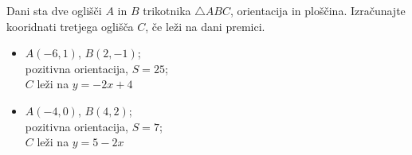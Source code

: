             \begin{naloga}
                Dani sta dve oglišči $A$ in $B$ trikotnika $\triangle ABC$, orientacija in ploščina. Izračunajte kooridnati tretjega oglišča $C$, če leži na dani premici.
                \begin{itemize}
                    \item $A(-6,1)$, $B(2,-1)$; \\ pozitivna orientacija, $S=25$; \\ $C$ leži na $y=-2x+4$
                    \item $A(-4,0)$, $B(4,2)$; \\ pozitivna orientacija, $S=7$; \\ $C$ leži na $y=5-2x$
                \end{itemize}
            \end{naloga}


        